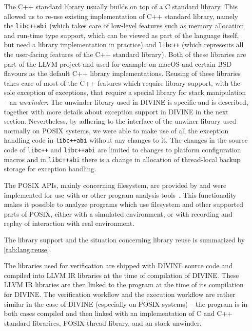The C++ standard library usually builds on top of a C standard library.
This allowed us to re-use existing implementation of C++ standard library,
namely the \texttt{libc++abi} (which takes care of low-level features such as
memory allocation and run-time type support, which can be viewed as part of the
language itself, but need a library implementation in practice) and
\texttt{libc++} (which represents all the user-facing features of the C++
standard library).
Both of these libraries are part of the LLVM project and used for example on
macOS and certain BSD flavours as the default C++ library implementations.
Reusing of these libraries takes care of most of the C++ features which require
library support, with the sole exception of exceptions, that require a special
library for stack manipulation -- an \emph{unwinder}.
The unwinder library used in DIVINE is \divm specific and is described,
together with more details about exception support in DIVINE in the next
section.
Nevertheless, by adhering to the interface of the unwiner library used normally
on POSIX systems, we were able to make use of all the exception handling code
in \texttt{libc++abi} without any changes to it.
The changes in the source code of \texttt{libc++} and \texttt{libc++abi} are limited to changes to platform configuration macros and in \texttt{libc++abi} there is a change in allocation of thread-local backup storage for exception handling.

The POSIX APIs, mainly concerning filesystem, are provided by \dios and were
implemented for use with \divine or other program analysis
tools~.
This functionality makes it possible to analyze programs which use filesystem and other supported parts of POSIX, either with a simulated environment, or with recording and replay of interaction with real environment.

The library support and the situation concerning library reuse is summarized by \autoref{tab:lang:reuse}.

The libraries used for verification are shipped with DIVINE source code and
compiled into LLVM IR libraries at the time of compilation of DIVINE.
These LLVM IR libraries are then linked to the program at the time of its
compilation for DIVINE.
The verification workflow and the execution workflow are rather similar in the
case of DIVINE (especially on POSIX systems) -- the program is in both cases
compiled and then linked with an implementation of C and C++ standard
librarires, POSIX thread library, and an stack unwinder.

